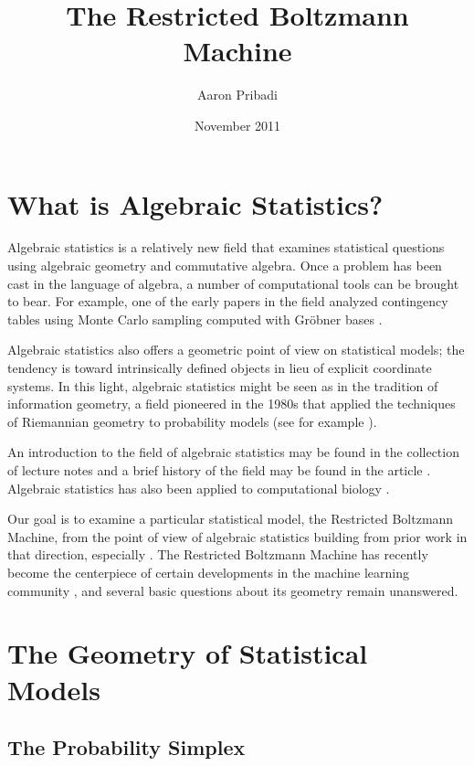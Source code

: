 \documentclass[11pt,titlepage]{article}
\title{The Restricted Boltzmann Machine}
\author{Aaron Pribadi}
\date{November 2011}
\numberwithin{equation}{section}
\begin{document}
\maketitle

\tableofcontents

\pagebreak

\section{What is Algebraic Statistics?}

    Algebraic statistics is a relatively new field that examines statistical
    questions using algebraic geometry and commutative algebra.  Once a problem
    has been cast in the language of algebra, a number of computational tools
    can be brought to bear.  For example, one of the early papers in the field
    analyzed contingency tables using Monte Carlo sampling computed with Gröbner
    bases \cite{DS98}.

    Algebraic statistics also offers a geometric point of view on statistical
    models; the tendency is toward intrinsically defined objects in lieu of
    explicit coordinate systems.  In this light, algebraic statistics might be
    seen as in the tradition of information geometry, a field pioneered in the
    1980s that applied the techniques of Riemannian geometry to probability
    models (see for example \cite{Ama}).

    An introduction to the field of algebraic statistics may be found in the
    collection of lecture notes \cite{DSS08} and a brief history of the field
    may be found in the article \cite{Ric09}.  Algebraic statistics has also
    been applied to computational biology \cite{ASCB}.

    Our goal is to examine a particular statistical model, the Restricted
    Boltzmann Machine, from the point of view of algebraic statistics building
    from prior work in that direction, especially \cite{CMS09}.  The Restricted
    Boltzmann Machine has recently become the centerpiece of certain
    developments in the machine learning community \cite{Hin07}, and several
    basic questions about its geometry remain unanswered.

\section{The Geometry of Statistical Models}
    \subsection{The Probability Simplex}
\end{document}
